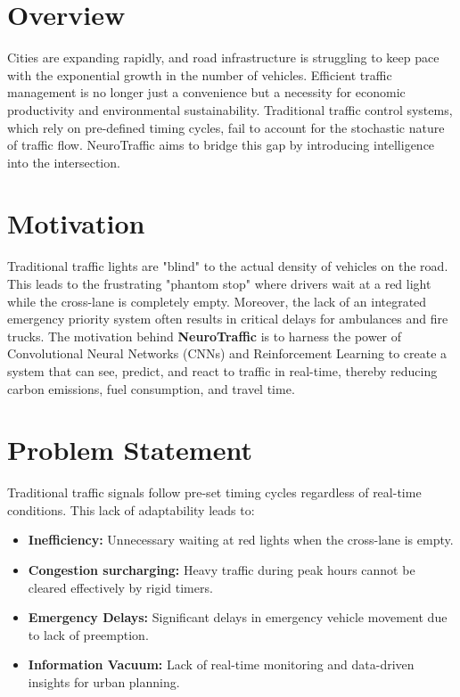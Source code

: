\documentclass[12pt,a4paper]{report}
\begin{document}
\section{Overview}
Cities are expanding rapidly, and road infrastructure is struggling to keep pace with the exponential growth in the number of vehicles. Efficient traffic management is no longer just a convenience but a necessity for economic productivity and environmental sustainability. Traditional traffic control systems, which rely on pre-defined timing cycles, fail to account for the stochastic nature of traffic flow. NeuroTraffic aims to bridge this gap by introducing intelligence into the intersection.

\section{Motivation}
Traditional traffic lights are "blind" to the actual density of vehicles on the road. This leads to the frustrating "phantom stop" where drivers wait at a red light while the cross-lane is completely empty. Moreover, the lack of an integrated emergency priority system often results in critical delays for ambulances and fire trucks. The motivation behind \textbf{NeuroTraffic} is to harness the power of Convolutional Neural Networks (CNNs) and Reinforcement Learning to create a system that can see, predict, and react to traffic in real-time, thereby reducing carbon emissions, fuel consumption, and travel time.

\section{Problem Statement}
Traditional traffic signals follow pre-set timing cycles regardless of real-time conditions. This lack of adaptability leads to:
\begin{itemize}
    \item \textbf{Inefficiency:} Unnecessary waiting at red lights when the cross-lane is empty.
    \item \textbf{Congestion surcharging:} Heavy traffic during peak hours cannot be cleared effectively by rigid timers.
    \item \textbf{Emergency Delays:} Significant delays in emergency vehicle movement due to lack of preemption.
    \item \textbf{Information Vacuum:} Lack of real-time monitoring and data-driven insights for urban planning.
\end{itemize}
\end{document}
